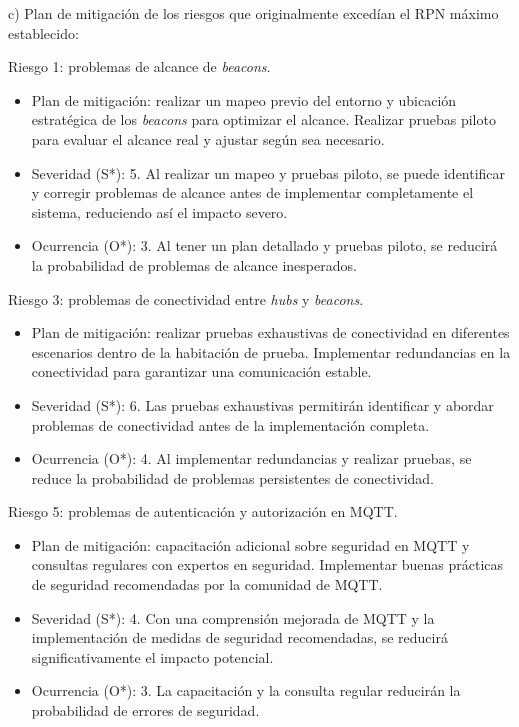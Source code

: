 \documentclass[
11pt, %
]{charter}
\begin{document}
c) Plan de mitigación de los riesgos que originalmente excedían el RPN máximo establecido:

Riesgo 1: problemas de alcance de \textit{beacons}.
\begin{itemize}
	\item Plan de mitigación: realizar un mapeo previo del entorno y ubicación estratégica de los \textit{beacons} para optimizar el alcance. Realizar pruebas piloto para evaluar el alcance real y ajustar según sea necesario.
	\item Severidad (S*): 5. Al realizar un mapeo y pruebas piloto, se puede identificar y corregir problemas de alcance antes de implementar completamente el sistema, reduciendo así el impacto severo.
	\item Ocurrencia (O*): 3. Al tener un plan detallado y pruebas piloto, se reducirá la probabilidad de problemas de alcance inesperados.
\end{itemize}
 
Riesgo 3: problemas de conectividad entre \textit{hubs} y \textit{beacons}.
\begin{itemize}
	\item Plan de mitigación: realizar pruebas exhaustivas de conectividad en diferentes escenarios dentro de la habitación de prueba. Implementar redundancias en la conectividad para garantizar una comunicación estable.
	\item Severidad (S*): 6. Las pruebas exhaustivas permitirán identificar y abordar problemas de conectividad antes de la implementación completa.
	\item Ocurrencia (O*): 4. Al implementar redundancias y realizar pruebas, se reduce la probabilidad de problemas persistentes de conectividad.
\end{itemize}

Riesgo 5: problemas de autenticación y autorización en MQTT.
\begin{itemize}
	\item Plan de mitigación: capacitación adicional sobre seguridad en MQTT y consultas regulares con expertos en seguridad. Implementar buenas prácticas de seguridad recomendadas por la comunidad de MQTT.
	\item Severidad (S*): 4. Con una comprensión mejorada de MQTT y la implementación de medidas de seguridad recomendadas, se reducirá significativamente el impacto potencial.
	\item Ocurrencia (O*): 3. La capacitación y la consulta regular reducirán la probabilidad de errores de seguridad.
\end{itemize}
\end{document}
